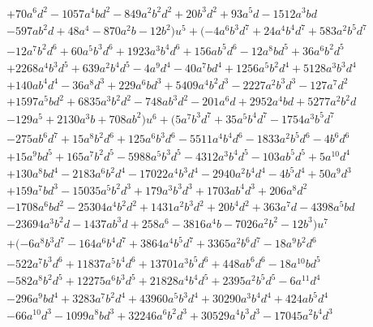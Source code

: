 \documentclass{gtpart}
\theoremstyle{definition}
\theoremstyle{remark}
\begin{document}
\begin{equation*}
\begin{split}
~~~~~~~& + 70 a^6 d^2 - 1057 a^4 b d^2 - 849 a^2 b^2 d^2 + 20 b^3 d^2 + 93 a^5 d - 1512 a^3 b d \\
      & - 597 a b^2 d + 48 a^4 - 870 a^2 b - 12 b^2) u^5 + (-4 a^6 b^3 d^7 + 24 a^4 b^4 d^7 + 583 a^2 b^5 d^7 \\
      & - 12 a^7 b^2 d^6 + 60 a^5 b^3 d^6 + 1923 a^3 b^4 d^6 + 156 a b^5 d^6 - 12 a^8 b d^5 + 36 a^6 b^2 d^5 \\
      & + 2268 a^4 b^3 d^5 + 639 a^2 b^4 d^5 - 4 a^9 d^4 - 40 a^7 b d^4 + 1256 a^5 b^2 d^4 + 5128 a^3 b^3 d^4 \\
      & + 140 a b^4 d^4 - 36 a^8 d^3 + 229 a^6 b d^3 + 5409 a^4 b^2 d^3 - 2227 a^2 b^3 d^3 - 127 a^7 d^2 \\
      & + 1597 a^5 b d^2 + 6835 a^3 b^2 d^2 - 748 a b^3 d^2 - 201 a^6 d + 2952 a^4 b d + 5277 a^2 b^2 d \\
      & - 129 a^5 + 2130 a^3 b + 708 a b^2) u^6 + (5 a^7 b^3 d^7 + 35 a^5 b^4 d^7 - 1754 a^3 b^5 d^7 \\
      & - 275 a b^6 d^7 + 15 a^8 b^2 d^6 + 125 a^6 b^3 d^6 - 5511 a^4 b^4 d^6 - 1833 a^2 b^5 d^6 - 4 b^6 d^6 \\
      & + 15 a^9 b d^5 + 165 a^7 b^2 d^5 - 5988 a^5 b^3 d^5 - 4312 a^3 b^4 d^5 - 103 a b^5 d^5 + 5 a^{10} d^4 \\
      & + 130 a^8 b d^4 - 2183 a^6 b^2 d^4 - 17022 a^4 b^3 d^4 - 2940 a^2 b^4 d^4 - 4 b^5 d^4 + 50 a^9 d^3 \\
      & + 159 a^7 b d^3 - 15035 a^5 b^2 d^3 + 179 a^3 b^3 d^3 + 1703 a b^4 d^3 + 206 a^8 d^2 \\
      & - 1708 a^6 b d^2 - 25304 a^4 b^2 d^2 + 1431 a^2 b^3 d^2 + 20 b^4 d^2 + 363 a^7 d - 4398 a^5 b d \\
      & - 23694 a^3 b^2 d - 1437 a b^3 d + 258 a^6 - 3816 a^4 b - 7026 a^2 b^2 - 12 b^3) u^7 \\
      & + (-6 a^8 b^3 d^7 - 164 a^6 b^4 d^7 + 3864 a^4 b^5 d^7 + 3365 a^2 b^6 d^7 - 18 a^9 b^2 d^6 \\
      & - 522 a^7 b^3 d^6 + 11837 a^5 b^4 d^6 + 13701 a^3 b^5 d^6 + 448 a b^6 d^6 - 18 a^{10} b d^5 \\
      & - 582 a^8 b^2 d^5 + 12275 a^6 b^3 d^5 + 21828 a^4 b^4 d^5 + 2395 a^2 b^5 d^5 - 6 a^{11} d^4 \\
      & - 296 a^9 b d^4 + 3283 a^7 b^2 d^4 + 43960 a^5 b^3 d^4 + 30290 a^3 b^4 d^4 + 424 a b^5 d^4 \\
      & - 66 a^{10} d^3 - 1099 a^8 b d^3 + 32246 a^6 b^2 d^3 + 30529 a^4 b^3 d^3 - 17045 a^2 b^4 d^3 \\

\end{split}
\end{equation*}
\end{document}
